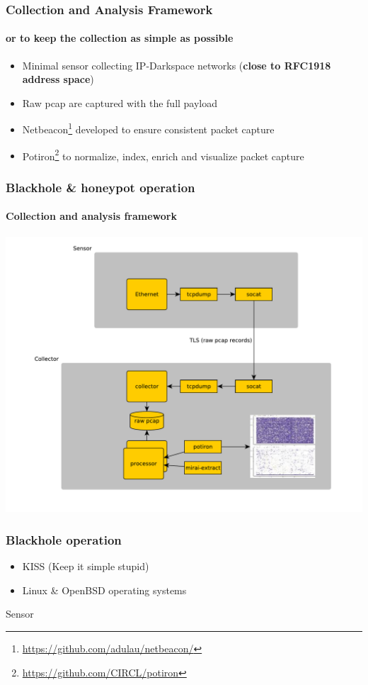 \documentclass{beamer}
\begin{document}
\begin{frame}
        \frametitle{Collection and Analysis Framework}
        \framesubtitle{or to keep the collection as simple as possible}
        \begin{itemize}
           \item Minimal sensor collecting IP-Darkspace networks (\textbf{close to RFC1918 address space})
           \item Raw pcap are captured with the full payload
           \item Netbeacon\footnote{\url{https://github.com/adulau/netbeacon/}} developed to ensure consistent packet capture
           \item Potiron\footnote{\url{https://github.com/CIRCL/potiron}} to normalize, index, enrich and visualize packet capture
        \end{itemize}
\end{frame}

\begin{frame}
        \frametitle{Blackhole \& honeypot operation}
        \framesubtitle{Collection and analysis framework}
        \includegraphics[scale=0.29]{overview-sensor.pdf}
\end{frame}

\begin{frame}
\frametitle{Blackhole operation}
    \begin{definition}[Principle]
        \begin{itemize}
            \item KISS (Keep it simple stupid)
            \item Linux \& OpenBSD operating systems
        \end{itemize}
    \end{definition}

    \begin{block}{Sensor}
    
    \end{block}
\end{frame}
\end{document}
